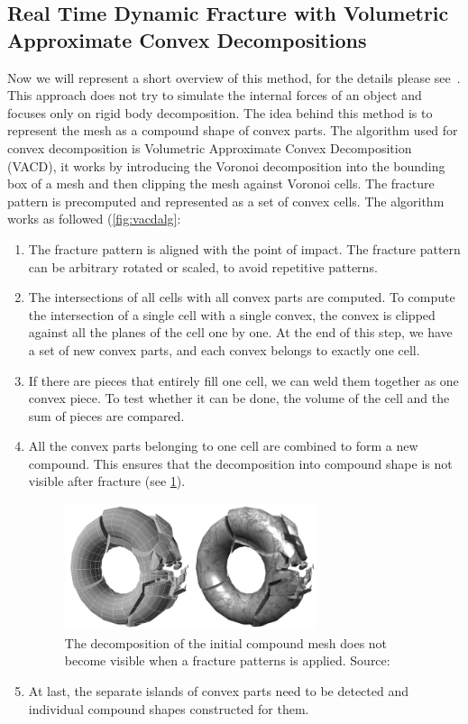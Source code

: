 \subsection{Real Time Dynamic Fracture
with Volumetric Approximate Convex Decompositions}
\label{sec:RTDF}
Now we will represent a short overview of this method, for the details please see~\citet{nvidia}.
This approach does not try to simulate the internal forces of an object and focuses only on rigid body decomposition. The idea behind this method is to represent the mesh as a compound shape of convex parts. The algorithm used for convex decomposition is Volumetric Approximate Convex Decomposition (VACD), it works by introducing the Voronoi decomposition into the bounding box of a mesh and then clipping the mesh against Voronoi cells. The fracture pattern is precomputed and represented as a set of convex cells. The algorithm works as followed (\cref{fig:vacdalg}:
\begin{enumerate}
\item The fracture pattern is aligned with the point of impact. The fracture pattern can be arbitrary rotated or scaled, to avoid repetitive patterns.
\item The intersections of all cells with all convex parts are computed.  To compute the intersection of a single cell with a single convex, the convex is clipped against all the planes of the cell one by one. 
At the end of this step, we have a set of new convex parts, and each convex belongs to exactly one cell.
\item If there are pieces that entirely fill one cell, we can weld them together as one convex piece. To test whether it can be done, the volume of the cell and the sum of pieces are compared.
\item All the convex parts belonging to one cell are combined to form a new compound. This ensures that the decomposition into compound shape is not visible after fracture (see \cref{fig:vacdfracture}).
\begin{figure}
        \centering
        \includegraphics[width=0.7\textwidth]{img/vacdfracture}
        \caption{The decomposition of the
initial compound mesh does not become visible when a fracture
patterns is applied. Source: \citet{nvidia}}
        \label{fig:vacdfracture}
\end{figure}
\item At last, the separate islands of convex parts need to be detected and individual compound shapes constructed for them.
\end{enumerate}

